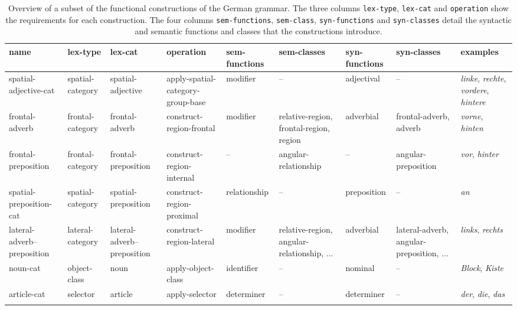 \begin{sidewaystable}
\begin{footnotesize}
\begin{tabularx}{\textwidth}{XXXXXXXXX}
\lsptoprule
name & lex-type & lex-cat & operation & sem-functions & sem-classes & syn-functions & syn-classes & examples 
\\ \midrule
spatial-adjective-cat  & spatial-category & spatial-adjective & apply-spatial-category-group-base &modifier & -- & adjectival & -- & \textit{linke}, \textit{rechte}, \textit{vordere}, \textit{hintere}
\\ \midrule
frontal-adverb  &frontal-category &frontal-adverb  & construct-region-frontal &modifier &relative-region, frontal-region, region &adverbial &frontal-adverb, adverb & \textit{vorne}, \textit{hinten} 
\\ \midrule
frontal-preposition  &frontal-category & frontal-preposition & construct-region-internal & -- & angular-relationship & -- & angular-preposition & \textit{vor}, \textit{hinter} 
\\ \midrule
spatial-preposition-cat  &spatial-category &spatial-preposition & construct-region-proximal &relationship & -- &preposition & -- & \textit{an}
\\ \midrule
lateral-adverb--preposition  &lateral-category &lateral-adverb--preposition & construct-region-lateral &modifier &relative-region, angular-relationship, ... &adverbial &lateral-adverb, angular-preposition, ... & \textit{links}, \textit{rechts}
\\ \midrule
noun-cat  &object-class &noun & apply-object-class &identifier & -- &nominal & -- & \textit{Block}, \textit{Kiste} 
\\ \midrule
article-cat  &selector &article & apply-selector &determiner & -- &determiner & -- & \textit{der}, \textit{die}, \textit{das} 
\\ \lspbottomrule
\end{tabularx}
\caption[Functional constructions]
{Overview of a subset of the functional constructions of the German grammar. 
The three columns {\footnotesize\tt lex-type},
{\footnotesize\tt lex-cat} and {\footnotesize\tt operation} show the requirements for each construction.
The four columns {\footnotesize\tt sem-functions}, {\footnotesize\tt sem-class}, {\footnotesize\tt syn-functions}
and {\footnotesize\tt syn-classes} detail the syntactic and semantic functions and classes that
the constructions introduce.}
\label{t:functional-constructions}
\end{footnotesize}
\end{sidewaystable}
